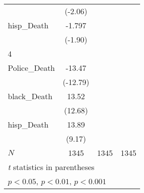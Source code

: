 {\begin{tabular}{l*{3}{c}}
            &     (-2.06)         &                     &                     \\
[1em]
hisp\_Death  &      -1.797         &                     &                     \\
            &     (-1.90)         &                     &                     \\
\hline
4           &                     &                     &                     \\
Police\_Death&      -13.47\sym{***}&                     &                     \\
            &    (-12.79)         &                     &                     \\
[1em]
black\_Death &       13.52\sym{***}&                     &                     \\
            &     (12.68)         &                     &                     \\
[1em]
hisp\_Death  &       13.89\sym{***}&                     &                     \\
            &      (9.17)         &                     &                     \\
\hline
\(N\)       &        1345         &        1345         &        1345         \\
\hline\hline
\multicolumn{4}{l}{\footnotesize \textit{t} statistics in parentheses}\\
\multicolumn{4}{l}{\footnotesize \sym{*} \(p<0.05\), \sym{**} \(p<0.01\), \sym{***} \(p<0.001\)}\\
\end{tabular}
}

